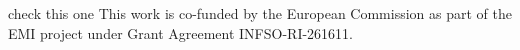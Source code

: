 \TODO check this one
This work is co-funded by the European Commission as part of
the EMI project under
Grant Agreement INFSO-RI-261611.
